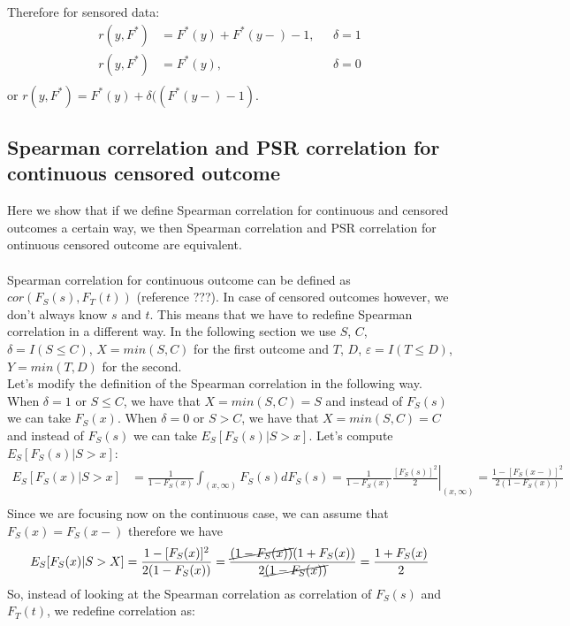 \documentclass[]{article}
\let\epsilon\varepsilon
\begin{document}
Therefore for sensored data:
	$$
	\begin{aligned}
		r(y, F^*) &= F^*(y) + F^*(y-) - 1,~~~&\delta = 1 \\
		r(y, F^*) &= F^*(y) ,~~~&\delta = 0 \\
	\end{aligned}
	$$
or $r(y, F^*) = F^*(y) + \delta((F^*(y-) - 1)$.

\subsection{Spearman correlation and PSR correlation for continuous censored outcome}
Here we show that if we define Spearman correlation for continuous and censored outcomes a certain way, we then Spearman correlation and PSR correlation for ontinuous censored outcome are equivalent.\\
~\\
Spearman correlation for continuous outcome can be defined as $cor(F_S(s), F_T(t))$ (reference ???). In case of censored outcomes however, we don't always know $s$ and $t$. This means that we have to redefine Spearman correlation in a different way. In the following section we use $S$, $C$, $\delta=I(S\leq C)$, $X = min(S, C)$ for the first outcome and $T$, $D$, $\epsilon=I(T\leq D)$, $Y = min(T, D)$ for the second.\\
Let's modify the definition of the Spearman correlation in the following way. When $\delta = 1$ or $S\leq C$, we have that $X = min(S, C)=S$ and instead of $F_S(s)$ we can take $F_S(x)$. When $\delta = 0$ or $S > C$, we have that $X = min(S, C)=C$ and instead of $F_S(s)$ we can take $E_S[F_S(s)|S>x]$. Let's compute $E_S[F_S(s)|S>x]$:
	$$
	\begin{aligned}
		E_S[F_S(x)|S>x] &= \frac{1}{1-F_S(x)}\int_{(x, \infty)} F_S(s)dF_S(s) = \frac{1}{1-F_S(x)} \left.\frac{ [F_S(s)]^2}{2}\right|_{(x, \infty)} = \frac{1-[F_S(x-)]^2}{2(1-F_S(x))} \\
	\end{aligned}
	$$
Since we are focusing now on the continuous case, we can assume that $F_S(x)=F_S(x-)$ therefore we have
	$$
	\begin{aligned}
		E_S[F_S(x)|S>X] &=\frac{1-[F_S(x)]^2}{2(1-F_S(x))}=\frac{\cancel{(1-F_S(x))}(1+F_S(x))}{2\cancel{(1-F_S(x))}}  = \frac{1+F_S(x)}{2} \\
	\end{aligned}
	$$
So, instead of looking at the Spearman correlation as correlation of $F_S(s)$ and $F_T(t)$, we redefine correlation as:
\end{document}
